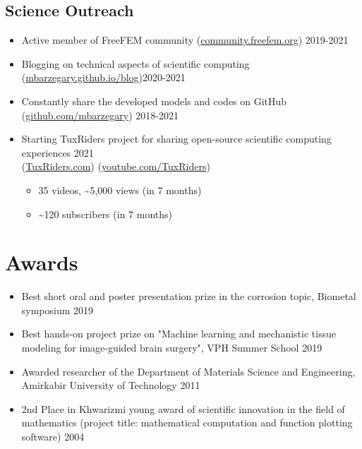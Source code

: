 \documentclass{cv}
\begin{document}
\subsection{Science Outreach}

\begin{itemize}
\item
Active member of FreeFEM community (\href{https://community.freefem.org/}{community.freefem.org}) \hfill 2019-2021
\item
Blogging on technical aspects of scientific computing (\href{https://mbarzegary.github.io/blog}{mbarzegary.github.io/blog})\hfill 2020-2021
\item
Constantly share the developed models and codes on GitHub (\href{https://github.com/mbarzegary}{github.com/mbarzegary}) \hfill 2018-2021
\item
Starting TuxRiders project for sharing open-source scientific computing experiences \hfill 2021
\\ (\href{http://www.tuxriders.com/}{TuxRiders.com}) (\href{https://www.youtube.com/TuxRiders}{youtube.com/TuxRiders})
\begin{itemize}
\item 35 videos, \textasciitilde 5,000 views (in 7 months)
\item \textasciitilde 120 subscribers (in 7 months)
\end{itemize}
\end{itemize}



\section{Awards}

\begin{itemize}
\item
Best short oral and poster presentation prize in the corrosion topic, Biometal symposium \hfill 2019
\item
Best hands-on project prize on "Machine learning and mechanistic tissue modeling for image-guided brain surgery", VPH Summer School \hfill 2019
\item
Awarded researcher of the Department of Materials Science and Engineering, Amirkabir University of Technology \hfill 2011
\item
2nd Place in Khwarizmi young award of scientific innovation in the field of mathematics (project title: mathematical computation and function plotting software) \hfill 2004
\end{itemize}
\end{document}
